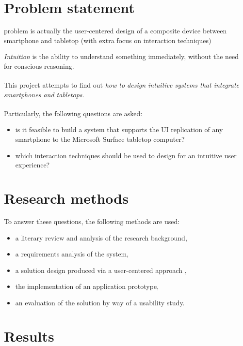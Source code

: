 \section{Problem statement}

problem is actually the user-centered design of a composite device between smartphone and tabletop (with extra focus on interaction techniques)

\emph{Intuition} is the ability to understand something immediately, without the need for conscious reasoning.
\\\\
This project attempts to find out \emph{how to design intuitive systems that integrate smartphones and tabletops.}
\\\\
Particularly, the following questions are asked:
\begin{itemize}
\item is it feasible to build a system that supports the UI replication of any smartphone to the Microsoft Surface tabletop computer?
\item which interaction techniques should be used to design for an intuitive user experience?
\end{itemize}

\section{Research methods}


To answer these questions, the following methods are used:
\begin{itemize}
\item a literary review and analysis of the research background,
\item a requirements analysis of the system,
\item a solution design produced via a user-centered approach \citep{Benyon:2010},
\item the implementation of an application prototype,
\item an evaluation of the solution by way of a usability study.
\end{itemize}

\section{Results}

